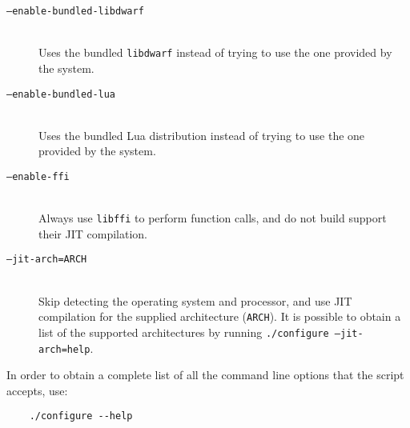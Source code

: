 \begin{description}

	\item [\texttt{--enable-bundled-libdwarf}] \hfill\\
		Uses the bundled \verb|libdwarf| instead of trying to use the one
		provided by the system.

	\item [\texttt{--enable-bundled-lua}] \hfill\\
		Uses the bundled Lua distribution instead of trying to use the one
		provided by the system.

	\item [\texttt{--enable-ffi}] \hfill\\
		Always use \verb|libffi| to perform function calls, and do not build
		support their JIT compilation.

	\item [\texttt{--jit-arch=ARCH}] \hfill\\
		Skip detecting the operating system and processor, and use JIT
		compilation for the supplied architecture (\verb|ARCH|). It is
		possible to obtain a list of the supported architectures by running
		\texttt{./configure --jit-arch=help}.

\end{description}

In order to obtain a complete list of all the command line options that the
script accepts, use:

\begin{verbatim}
	./configure --help
\end{verbatim}
